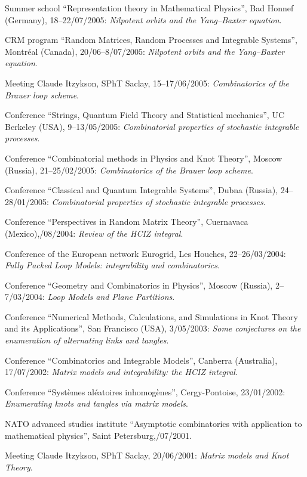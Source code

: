 \s Summer school ``Representation theory in Mathematical Physics'', Bad Honnef (Germany),
18--22/07/2005:
{\sl Nilpotent orbits and the Yang--Baxter equation}.

\s CRM program ``Random Matrices, Random Processes and Integrable Systems'', Montr\'eal (Canada),
20/06--8/07/2005:
{\sl Nilpotent orbits and the Yang--Baxter equation}.

\s Meeting Claude Itzykson, SPhT Saclay, 15--17/06/2005:
{\sl Combinatorics of the Brauer loop scheme}.

\s Conference ``Strings, Quantum Field Theory and Statistical mechanics'', UC Berkeley (USA), 9--13/05/2005: {\sl Combinatorial properties of stochastic integrable processes}.

\s Conference ``Combinatorial methods in Physics and Knot Theory'', Moscow (Russia), 21--25/02/2005:
{\sl Combinatorics of the Brauer loop scheme}.

\s Conference ``Classical and Quantum Integrable Systems'', Dubna (Russia), 24--28/01/2005:
{\sl Combinatorial properties of stochastic integrable processes}.

\s Conference ``Perspectives in Random Matrix Theory'', Cuernavaca (Mexico),/08/2004:
{\sl Review of the HCIZ integral}.

\s Conference of the European network Eurogrid, Les Houches, 22--26/03/2004:
{\sl Fully Packed Loop Models: integrability and combinatorics}.

\s Conference ``Geometry and Combinatorics in Physics'', Moscow (Russia), 2--7/03/2004:
{\sl Loop Models and Plane Partitions}.

\s Conference ``Numerical Methods, Calculations, and Simulations in Knot
Theory and its Applications'', San Francisco (USA), 3/05/2003: 
{\sl Some conjectures on the enumeration of alternating links and tangles}.

\s Conference ``Combinatorics and Integrable Models'', Canberra (Australia),
17/07/2002: {\sl Matrix models and integrability: the HCIZ integral}.

\s Conference ``Syst\`emes al\'eatoires inhomog\`enes'', Cergy-Pontoise,
23/01/2002: {\sl Enumerating knots and tangles via matrix models}.

\s NATO advanced studies institute ``Asymptotic combinatorics
with application to mathematical physics'', Saint Petersburg,/07/2001.

\s Meeting Claude Itzykson, SPhT Saclay, 20/06/2001:
{\sl Matrix models and Knot Theory}.

